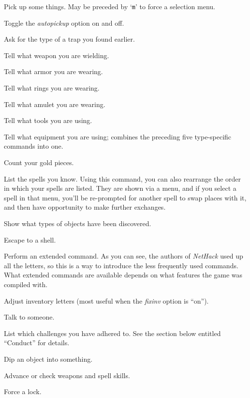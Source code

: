 Pick up some things. May be preceded by `{\tt m}' to force a selection menu.
\item[\tb{@}]
Toggle the {\it autopickup\/} option on and off.
\item[\tb{\^{}}]
Ask for the type of a trap you found earlier.
\item[\tb{)}]
Tell what weapon you are wielding.
\item[\tb{[}]
Tell what armor you are wearing.
\item[\tb{=}]
Tell what rings you are wearing.
\item[\tb{"}]
Tell what amulet you are wearing.
\item[\tb{(}]
Tell what tools you are using.
\item[\tb{*}]
Tell what equipment you are using; combines the preceding five type-specific
commands into one.
\item[\tb{\$}]
Count your gold pieces.
\item[\tb{+}]
List the spells you know.  Using this command, you can also rearrange
the order in which your spells are listed.  They are shown via a menu,
and if you select a spell in that menu, you'll be re-prompted for
another spell to swap places with it, and then have opportunity to
make further exchanges.
\item[\tb{$\backslash$}]
Show what types of objects have been discovered.
\item[\tb{!}]
Escape to a shell.
\item[\tb{\#}]
Perform an extended command.  As you can see, the authors of {\it NetHack\/}
used up all the letters, so this is a way to introduce the less frequently
used commands.
What extended commands are available depends on what features
the game was compiled with.
\item[\tb{\#adjust}]
Adjust inventory letters (most useful when the
{\it fixinv\/}
option is ``on'').
\item[\tb{\#chat}]
Talk to someone.
\item[\tb{\#conduct}]
List which challenges you have adhered to.  See the section below entitled
``Conduct'' for details.
\item[\tb{\#dip}]
Dip an object into something.
\item[\tb{\#enhance}]
Advance or check weapons and spell skills.
\item[\tb{\#force}]
Force a lock.
\item[\tb{\#invoke}]
